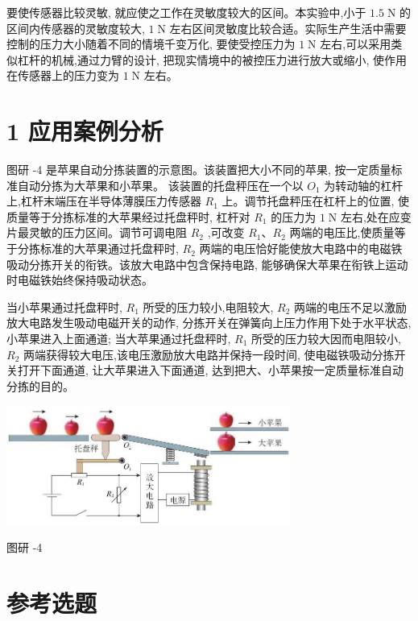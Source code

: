 \documentclass[10pt]{article}
\begin{document}
要使传感器比较灵敏, 就应使之工作在灵敏度较大的区间。本实验中,小于 \({1.5}\mathrm{\;N}\) 的区间内传感器的灵敏度较大, \(1\mathrm{\;N}\) 左右区间灵敏度比较合适。实际生产生活中需要控制的压力大小随着不同的情境千变万化, 要使受控压力为 \(1\mathrm{\;N}\) 左右,可以采用类似杠杆的机械,通过力臂的设计, 把现实情境中的被控压力进行放大或缩小, 使作用在传感器上的压力变为 \(1\mathrm{\;N}\) 左右。

\section*{1 应用案例分析}

图研 -4 是苹果自动分拣装置的示意图。该装置把大小不同的苹果, 按一定质量标准自动分拣为大苹果和小苹果。 该装置的托盘秤压在一个以 \({O}_{1}\) 为转动轴的杠杆上,杠杆末端压在半导体薄膜压力传感器 \({R}_{1}\) 上。调节托盘秤压在杠杆上的位置, 使质量等于分拣标准的大苹果经过托盘秤时, 杠杆对 \({R}_{1}\) 的压力为 \(1\mathrm{\;N}\) 左右,处在应变片最灵敏的压力区间。调节可调电阻 \({R}_{2}\) ,可改变 \({R}_{1}\text{、}{R}_{2}\) 两端的电压比,使质量等于分拣标准的大苹果通过托盘秤时, \({R}_{2}\) 两端的电压恰好能使放大电路中的电磁铁吸动分拣开关的衔铁。该放大电路中包含保持电路, 能够确保大苹果在衔铁上运动时电磁铁始终保持吸动状态。

当小苹果通过托盘秤时, \({R}_{1}\) 所受的压力较小,电阻较大, \({R}_{2}\) 两端的电压不足以激励放大电路发生吸动电磁开关的动作, 分拣开关在弹簧向上压力作用下处于水平状态, 小苹果进入上面通道; 当大苹果通过托盘秤时, \({R}_{1}\) 所受的压力较大因而电阻较小, \({R}_{2}\) 两端获得较大电压,该电压激励放大电路并保持一段时间, 使电磁铁吸动分拣开关打开下面通道, 让大苹果进入下面通道, 达到把大、小苹果按一定质量标准自动分拣的目的。

\begin{center}
\includegraphics[max width=0.7\textwidth]{images/01910e72-c5b7-7ed5-a6d4-fb3a5faefc32_118_274834.jpg}
\end{center}

图研 -4

\section*{参考选题}
\end{document}
